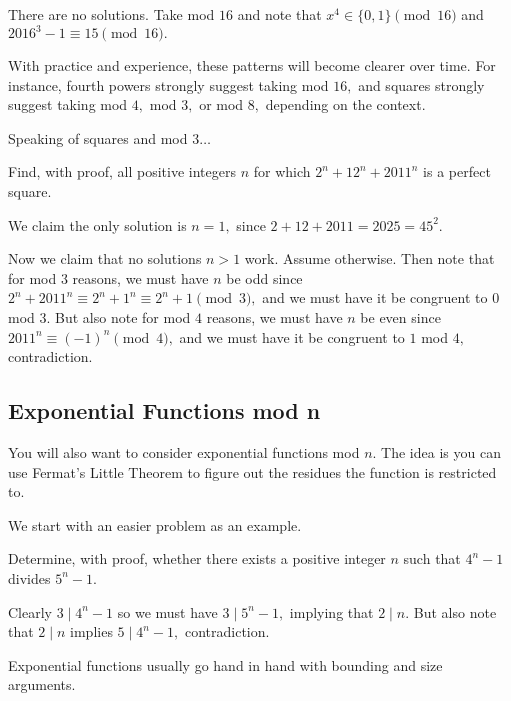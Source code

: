 \documentclass{article}
\begin{document}
\begin{sol}
There are no solutions. Take mod $16$ and note that $x^4\in \{0,1\}\pmod{16}$ and $2016^3-1\equiv 15\pmod{16}.$
\end{sol}

With practice and experience, these patterns will become clearer over time. For instance, fourth powers strongly suggest taking mod $16,$ and squares strongly suggest taking mod $4,$ mod $3,$ or mod $8,$ depending on the context.

Speaking of squares and mod $3\ldots$

\begin{exam}[USAJMO 2011/1]
Find, with proof, all positive integers $n$ for which $2^n + 12^n + 2011^n$ is a perfect square.
\end{exam}

\begin{sol}
We claim the only solution is $n=1,$ since $2+12+2011=2025=45^2.$

Now we claim that no solutions $n>1$ work. Assume otherwise. Then note that for mod $3$ reasons, we must have $n$ be odd since $2^n+2011^n\equiv 2^n+1^n\equiv 2^n+1\pmod{3},$ and we must have it be congruent to $0$ mod $3.$ But also note for mod $4$ reasons, we must have $n$ be even since $2011^n\equiv (-1)^n\pmod{4},$ and we must have it be congruent to $1$ mod $4,$ contradiction.
\end{sol}

\subsection{Exponential Functions mod n}
You will also want to consider exponential functions mod $n.$ The idea is you can use Fermat's Little Theorem to figure out the residues the function is restricted to.

We start with an easier problem as an example.

\begin{exam}
Determine, with proof, whether there exists a positive integer $n$ such that $4^n-1$ divides $5^n-1.$
\end{exam}

\begin{sol}
Clearly $3\mid 4^n-1$ so we must have $3\mid 5^n-1,$ implying that $2\mid n.$ But also note that $2\mid n$ implies $5\mid 4^n-1,$ contradiction.
\end{sol}
Exponential functions usually go hand in hand with bounding and size arguments.
\end{document}
